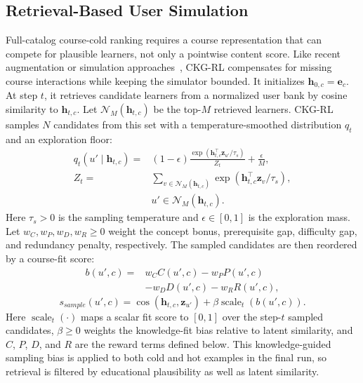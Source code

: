 \documentclass[letterpaper]{article}
\begin{document}
\subsection{Retrieval-Based User Simulation}
Full-catalog course-cold ranking requires a course representation that can compete for plausible learners, not only a pointwise content score. Like recent augmentation or simulation approaches~\cite{wang2024llmaugmenter,huang2025coldllm}, CKG-RL compensates for missing course interactions while keeping the simulator bounded. It initializes \(\mathbf{h}_{0,c}=\mathbf{e}_c\). At step \(t\), it retrieves candidate learners from a normalized user bank by cosine similarity to \(\mathbf{h}_{t,c}\). Let \(\mathcal{N}_M(\mathbf{h}_{t,c})\) be the top-\(M\) retrieved learners. CKG-RL samples \(N\) candidates from this set with a temperature-smoothed distribution \(q_t\) and an exploration floor:
\begin{equation}
\begin{aligned}
q_t(u'\mid \mathbf{h}_{t,c})=&
(1-\epsilon)
\frac{\exp(\mathbf{h}_{t,c}^{\top}\mathbf{z}_{u'}/\tau_s)}
{Z_t}
+\frac{\epsilon}{M},\\
Z_t=&
\sum_{v\in\mathcal{N}_M(\mathbf{h}_{t,c})}
\exp(\mathbf{h}_{t,c}^{\top}\mathbf{z}_{v}/\tau_s),\\
&u'\in\mathcal{N}_M(\mathbf{h}_{t,c}).
\end{aligned}
\end{equation}
Here \(\tau_s>0\) is the sampling temperature and \(\epsilon\in[0,1]\) is the exploration mass. Let \(w_C,w_P,w_D,w_R\geq0\) weight the concept bonus, prerequisite gap, difficulty gap, and redundancy penalty, respectively. The sampled candidates are then reordered by a course-fit score:
\begin{equation}
\begin{aligned}
b(u',c)=&
w_C C(u',c)-w_P P(u',c)\\
&-w_D D(u',c)-w_R R(u',c),
\end{aligned}
\end{equation}
\begin{equation}
s_{sample}(u',c)=
\cos(\mathbf{h}_{t,c},\mathbf{z}_{u'})
+\beta\operatorname{scale}_t(b(u',c)).
\end{equation}
Here \(\operatorname{scale}_t(\cdot)\) maps a scalar fit score to \([0,1]\) over the step-\(t\) sampled candidates, \(\beta\geq0\) weights the knowledge-fit bias relative to latent similarity, and \(C\), \(P\), \(D\), and \(R\) are the reward terms defined below. This knowledge-guided sampling bias is applied to both cold and hot examples in the final run, so retrieval is filtered by educational plausibility as well as latent similarity.
\end{document}
